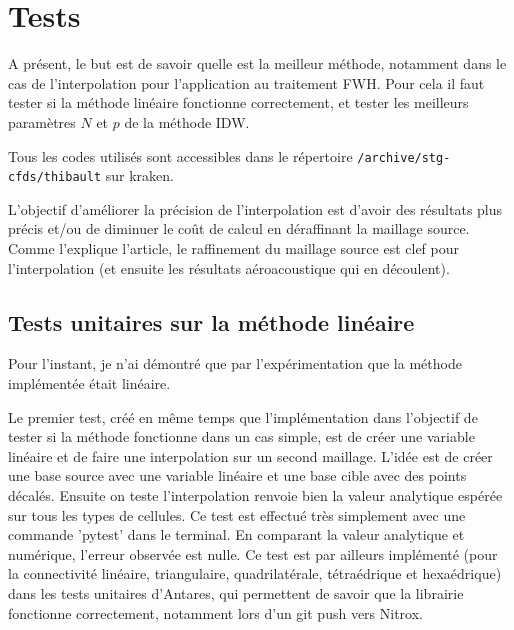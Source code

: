 

\section{Tests}
A présent, le but est de savoir quelle est la meilleur méthode, notamment dans le cas de l'interpolation pour l'application au traitement FWH. Pour cela il faut tester si la méthode linéaire fonctionne correctement, et tester les meilleurs paramètres \(N\) et \(p\) de la méthode IDW.

Tous les codes utilisés sont accessibles dans le répertoire \texttt{/archive/stg-cfds/thibault} sur kraken.

L'objectif d'améliorer la précision de l'interpolation est d'avoir des résultats plus précis et/ou de diminuer le coût de calcul en déraffinant la maillage source.
Comme l'explique l'article\cite{schoder2019}, le raffinement du maillage source est clef pour l'interpolation (et ensuite les résultats aéroacoustique qui en découlent).

\subsection{Tests unitaires sur la méthode linéaire}

Pour l'instant, je n'ai démontré que par l'expérimentation que la méthode implémentée était linéaire.

Le premier test, créé en même temps que l'implémentation dans l'objectif de tester si la méthode fonctionne dans un cas simple, est de créer une variable linéaire et de faire une interpolation sur un second maillage. L'idée est de créer une base source avec une variable linéaire et une base cible avec des points décalés. Ensuite on teste l'interpolation renvoie bien la valeur analytique espérée sur tous les types de cellules. Ce test est effectué très simplement avec une commande 'pytest' dans le terminal. En comparant la valeur analytique et numérique, l'erreur observée est nulle. Ce test est par ailleurs implémenté (pour la connectivité linéaire, triangulaire, quadrilatérale, tétraédrique et hexaédrique) dans les tests unitaires d'Antares, qui permettent de savoir que la librairie fonctionne correctement, notamment lors d'un git push vers Nitrox.

